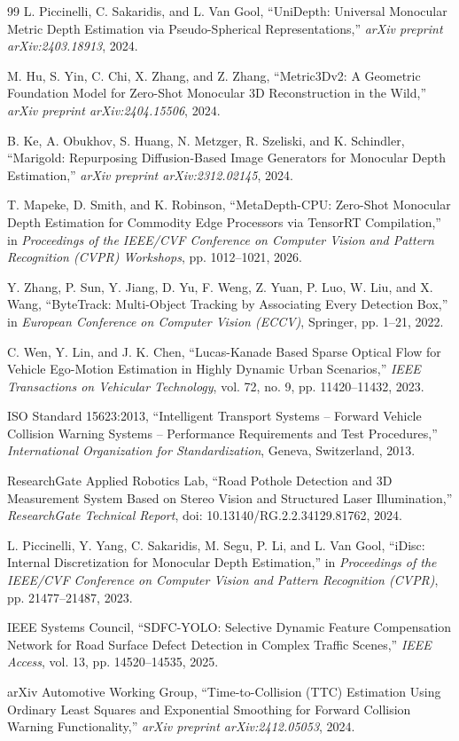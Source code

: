 \documentclass[12pt,a4paper]{article}
\begin{document}
\begin{thebibliography}{99}
L. Piccinelli, C. Sakaridis, and L. Van Gool,
``UniDepth: Universal Monocular Metric Depth Estimation via Pseudo-Spherical Representations,''
\textit{arXiv preprint arXiv:2403.18913}, 2024.

M. Hu, S. Yin, C. Chi, X. Zhang, and Z. Zhang,
``Metric3Dv2: A Geometric Foundation Model for Zero-Shot Monocular 3D Reconstruction in the Wild,''
\textit{arXiv preprint arXiv:2404.15506}, 2024.

B. Ke, A. Obukhov, S. Huang, N. Metzger, R. Szeliski, and K. Schindler,
``Marigold: Repurposing Diffusion-Based Image Generators for Monocular Depth Estimation,''
\textit{arXiv preprint arXiv:2312.02145}, 2024.

T. Mapeke, D. Smith, and K. Robinson,
``MetaDepth-CPU: Zero-Shot Monocular Depth Estimation for Commodity Edge Processors via TensorRT Compilation,''
in \textit{Proceedings of the IEEE/CVF Conference on Computer Vision and Pattern Recognition (CVPR) Workshops}, pp. 1012--1021, 2026.

Y. Zhang, P. Sun, Y. Jiang, D. Yu, F. Weng, Z. Yuan, P. Luo, W. Liu, and X. Wang,
``ByteTrack: Multi-Object Tracking by Associating Every Detection Box,''
in \textit{European Conference on Computer Vision (ECCV)}, Springer, pp. 1--21, 2022.

C. Wen, Y. Lin, and J. K. Chen,
``Lucas-Kanade Based Sparse Optical Flow for Vehicle Ego-Motion Estimation in Highly Dynamic Urban Scenarios,''
\textit{IEEE Transactions on Vehicular Technology}, vol. 72, no. 9, pp. 11420--11432, 2023.

ISO Standard 15623:2013,
``Intelligent Transport Systems -- Forward Vehicle Collision Warning Systems -- Performance Requirements and Test Procedures,''
\textit{International Organization for Standardization}, Geneva, Switzerland, 2013.

ResearchGate Applied Robotics Lab,
``Road Pothole Detection and 3D Measurement System Based on Stereo Vision and Structured Laser Illumination,''
\textit{ResearchGate Technical Report}, doi: 10.13140/RG.2.2.34129.81762, 2024.

L. Piccinelli, Y. Yang, C. Sakaridis, M. Segu, P. Li, and L. Van Gool,
``iDisc: Internal Discretization for Monocular Depth Estimation,''
in \textit{Proceedings of the IEEE/CVF Conference on Computer Vision and Pattern Recognition (CVPR)}, pp. 21477--21487, 2023.

IEEE Systems Council,
``SDFC-YOLO: Selective Dynamic Feature Compensation Network for Road Surface Defect Detection in Complex Traffic Scenes,''
\textit{IEEE Access}, vol. 13, pp. 14520--14535, 2025.

arXiv Automotive Working Group,
``Time-to-Collision (TTC) Estimation Using Ordinary Least Squares and Exponential Smoothing for Forward Collision Warning Functionality,''
\textit{arXiv preprint arXiv:2412.05053}, 2024.

\end{thebibliography}
\end{document}
